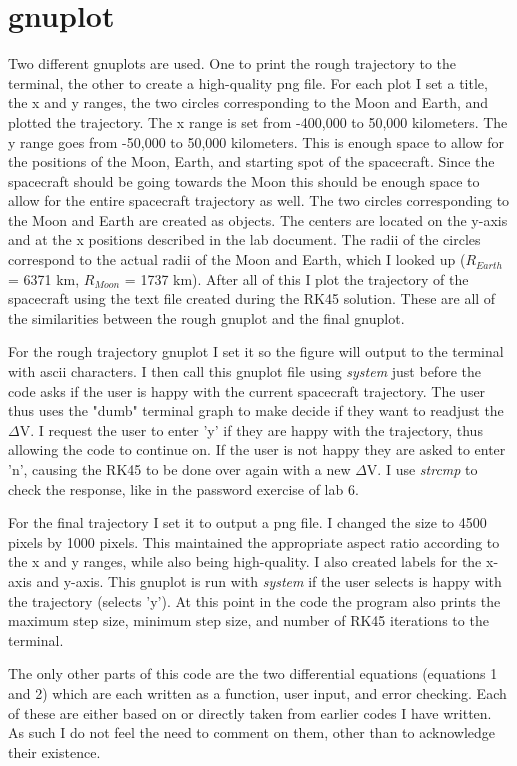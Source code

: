\documentclass{article}
\begin{document}
\section{gnuplot}
Two different gnuplots are used. One to print the rough trajectory to the terminal, the other to create a high-quality png file. For each plot I set a title, the x and y ranges, the two circles corresponding to the Moon and Earth, and plotted the trajectory. The x range is set from -400,000 to 50,000 kilometers. The y range goes from -50,000 to 50,000 kilometers. This is enough space to allow for the positions of the Moon, Earth, and starting spot of the spacecraft. Since the spacecraft should be going towards the Moon this should be enough space to allow for the entire spacecraft trajectory as well. The two circles corresponding to the Moon and Earth are created as objects. The centers are located on the y-axis and at the x positions described in the lab document. The radii of the circles correspond to the actual radii of the Moon and Earth, which I looked up ($R_{Earth}$ = 6371 km, $R_{Moon}$ = 1737 km). After all of this I plot the trajectory of the spacecraft using the text file created during the RK45 solution. These are all of the similarities between the rough gnuplot and the final gnuplot.

For the rough trajectory gnuplot I set it so the figure will output to the terminal with ascii characters. I then call this gnuplot file using \textit{system} just before the code asks if the user is happy with the current spacecraft trajectory. The user thus uses the "dumb" terminal graph to make decide if they want to readjust the $\Delta$V. I request the user to enter 'y' if they are happy with the trajectory, thus allowing the code to continue on. If the user is not happy they are asked to enter 'n', causing the RK45 to be done over again with a new $\Delta$V. I use \textit{strcmp} to check the response, like in the password exercise of lab 6.

For the final trajectory I set it to output a png file. I changed the size to 4500 pixels by 1000 pixels. This maintained the appropriate aspect ratio according to the x and y ranges, while also being high-quality. I also created labels for the x-axis and y-axis. This gnuplot is run with \textit{system} if the user selects is happy with the trajectory (selects 'y'). At this point in the code the program also prints the maximum step size, minimum step size, and number of RK45 iterations to the terminal.

The only other parts of this code are the two differential equations (equations 1 and 2) which are each written as a function, user input, and error checking. Each of these are either based on or directly taken from earlier codes I have written. As such I do not feel the need to comment on them, other than to acknowledge their existence.
\end{document}
